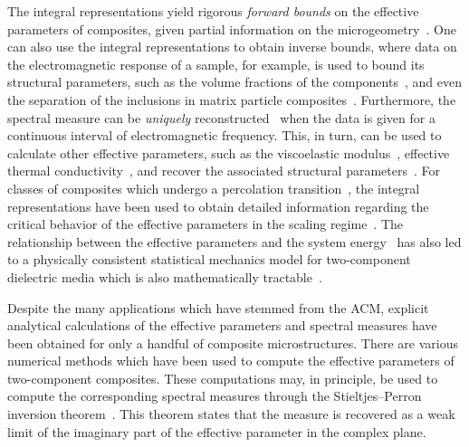 \documentclass{cmslatex}
\begin{document}
 
The integral representations yield rigorous \emph{forward bounds} on
the effective parameters of composites, given partial information on
the
microgeometry~\cite{Bergman:PRL-1285,Milton:APL-300,Golden:CMP-473,Bergman:AP-78,Bruno:PRSLA-353}. One    
can also use the integral representations to obtain inverse bounds, 
where data on the electromagnetic response of a sample, for example,
is used to bound its structural parameters, such as the volume
fractions of the
components~\cite{McPhedran:APA:19,McPhedran:MRSP:1990:195,Cherkaev:WRM-437,Cherkaev:IP-1203,Cherkaev:IP-065008,Zhang:JCP-5390,Bonifasi-Lista:PMB-3063,Cherkaev:JBiomech-345,Day:JPCM-99,Golden:JBM:337}, and even the separation of the inclusions in 
matrix particle composites~\cite{Orum:PRSLA:2012}. Furthermore, the
spectral measure can be \emph{uniquely}
reconstructed~\cite{Cherkaev:IP-1203} when the data is given for a
continuous interval of electromagnetic frequency. This, in turn, can
be used to calculate other effective parameters, such as the
viscoelastic modulus~\cite{Cherkaev:JBiomech-345}, effective thermal
conductivity~\cite{Cherkaev:2004:331,Cherkaev:PBCM:0921}, and recover
the associated structural
parameters~\cite{Cherkaev:IP-1203,Cherkaev:IP-065008,Zhang:JCP-5390,Bonifasi-Lista:PMB-3063,Cherkaev:JBiomech-345,Day:JPCM-99,Golden:JBM:337}.   
For classes of composites which undergo a percolation
transition~\cite{Stauffer-92,Torquato:RHM-02}, the integral
representations have 
been used to obtain detailed information regarding the critical
behavior of the effective parameters in the scaling
regime~\cite{Golden:PRL-3935,Murphy:JMP:063506}. The relationship
between the 
effective parameters and the system energy~\cite{Murphy:JMP:063506}
has also led to a physically consistent statistical mechanics model for
two-component dielectric media which is also mathematically
tractable~\cite{Murphy:PHD_Thesis}.  




Despite the many applications which have stemmed from the ACM,
explicit analytical calculations of the effective parameters and
spectral measures have been obtained for only a handful of composite
microstructures. There are various numerical methods which have been
used to compute the effective parameters of two-component
composites. These computations may, in principle, be used to compute
the corresponding spectral measures through the Stieltjes--Perron
inversion theorem~\cite{Henrici:1974:v2,MILTON:2002:TC}. This theorem
states that the measure is recovered as a weak limit of the imaginary
part of the effective parameter in the complex plane.
\end{document}
